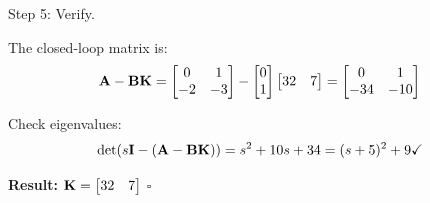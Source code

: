 \begin{example}
Step 5: Verify.

The closed-loop matrix is:
\begin{equation}
\mathbf{A} - \mathbf{B}\mathbf{K} = \begin{bmatrix} 0 & 1 \\ -2 & -3 \end{bmatrix} - \begin{bmatrix} 0 \\ 1 \end{bmatrix} \begin{bmatrix} 32 & 7 \end{bmatrix} = \begin{bmatrix} 0 & 1 \\ -34 & -10 \end{bmatrix}
\end{equation}

Check eigenvalues:
\begin{equation}
\det(s\mathbf{I} - (\mathbf{A} - \mathbf{B}\mathbf{K})) = s^2 + 10s + 34 = (s + 5)^2 + 9 \checkmark
\end{equation}

\textbf{Result:} $\mathbf{K} = \begin{bmatrix} 32 & 7 \end{bmatrix}$ \hfill $\square$
\end{example}

